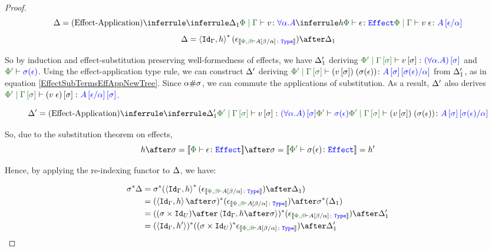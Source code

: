 \documentclass{Report}
\begin{document}
\begin{proof}
\begin{equation}\label{EffectSubTermsEffAppTree}
    \D = \ntreeruleII{Effect-Application}{\treeruleI{\D_1}{\gpetyperelation{v}{\all{\a}{A}}}}{\treeruleI{h}{\typerelation{\P}{\e}{\effect}}}{\gpetyperelation{\eapp{v}{\e}}{A\ssub{\a}{\e}}}
\end{equation}
\begin{equation}\label{EffectSubTermsEffAppDeno}
    \D = \pr{\Id{\G}}{h}\star(\e_{\deno{\typerelation{\P,\b}{A\ssub{\a}{\b}}{\type}}})\after\D_1
\end{equation}

So by induction and effect-substitution preserving well-formedness of effects, we have $\Delta_1'$ deriving $\etyperelation{\P'}{\G\ssi}{v\ssi}{(\all{\a}{A})\ssi}$ and $\wellformed{\P'}{\si(\e)}$. Using the effect-application type rule, we can construct $\Delta'$ deriving $\etyperelation{\P'}{\G\ssi}{\eapp{(v\ssi)}{(\si(\e))}}{A\ssi\ssub{\a}{\si(\e)}}$ from $\Delta_1'$, as in equation \ref{EffectSubTermsEffAppNewTree}. Since $\alpha\#\sigma$, we can commute the applications of substitution. As a result, $\Delta'$ also derives $\etyperelation{\P'}{\G\ssi}{(\eapp{v}{\e})\ssi}{A\ssub{\a}{\e}\ssi}$.


\begin{equation}
    \label{EffectSubTermsEffAppNewTree}
    \D' = \ntreeruleII{Effect-Application}{
    \treeruleI{\D_1'}{\etyperelation{\P'}{\G\ssi}{v\ssi}{(\all{\a}{A})\ssi}}
    }{
    \wellformed{\P'}{\si(\e)}
    }{\etyperelation{\P'}{\G\ssi}{\eapp{(v\ssi)}{(\si(\e))}}{A\ssi\ssub{\a}{\si(\e)}}}
\end{equation}



So, due to the substitution theorem on effects,
\begin{equation}
    h\after\si = \deno{\typerelation{\P}{\e}{\effect}}\after\si = \deno{\typerelation{\P'}{\si(\e)}{\effect}} = h'
\end{equation}

Hence, by applying the re-indexing functor to $\Delta$, we have:

\begin{align*}
    \si\star{\D} & = \si\star(\pr{\Id{\G}}{h}\star(\e_{\deno{\typerelation{\P,\b}{A\ssub{\a}{\b}}{\type}}})\after\D_1)\\
    & = (\pr{\Id{\G}}{h}\after\si)\star(\e_{\deno{\typerelation{\P,\b}{A\ssub{\a}{\b}}{\type}}})\after\si\star(\D_1)\\
    & = ((\si\times\Id{U})\after\pr{\Id{\G}}{h\after\si})\star(\e_{\deno{\typerelation{\P,\b}{A\ssub{\a}{\b}}{\type}}})\after\D_1'\\
    & = (\pr{\Id{\G}}{h'})\star((\si\times\Id{U})\star\e_{\deno{\typerelation{\P,\b}{A\ssub{\a}{\b}}{\type}}})\after\D_1'
\end{align*}


\end{proof}
\end{document}
